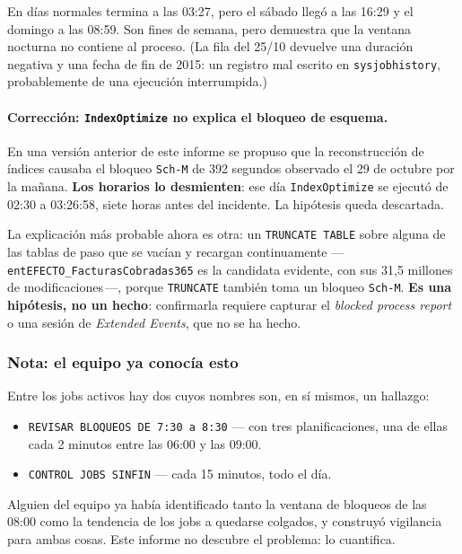 \documentclass[11pt,a4paper]{article}
\newcommand{\cod}[1]{\texttt{\small #1}}
\begin{document}
En días normales termina a las 03:27, pero el sábado llegó a las 16:29 y el
domingo a las 08:59. Son fines de semana, pero demuestra que la ventana
nocturna no contiene al proceso. (La fila del 25/10 devuelve una duración
negativa y una fecha de fin de 2015: un registro mal escrito en
\cod{sysjobhistory}, probablemente de una ejecución interrumpida.)

\paragraph{Corrección: \cod{IndexOptimize} no explica el bloqueo de esquema.}
En una versión anterior de este informe se propuso que la reconstrucción de
índices causaba el bloqueo \cod{Sch-M} de 392 segundos observado el 29 de
octubre por la mañana. \textbf{Los horarios lo desmienten}: ese día
\cod{IndexOptimize} se ejecutó de 02:30 a 03:26:58, siete horas antes del
incidente. La hipótesis queda descartada.

La explicación más probable ahora es otra: un \cod{TRUNCATE TABLE} sobre
alguna de las tablas de paso que se vacían y recargan continuamente
—\,\cod{entEFECTO\_FacturasCobradas365} es la candidata evidente, con sus
31,5 millones de modificaciones\,—, porque \cod{TRUNCATE} también toma un
bloqueo \cod{Sch-M}. \textbf{Es una hipótesis, no un hecho}: confirmarla
requiere capturar el \emph{blocked process report} o una sesión de
\emph{Extended Events}, que no se ha hecho.

\subsubsection*{Nota: el equipo ya conocía esto}

Entre los jobs activos hay dos cuyos nombres son, en sí mismos, un hallazgo:

\begin{itemize}\itemsep1pt
  \item \cod{REVISAR BLOQUEOS DE 7:30 a 8:30} — con tres planificaciones, una
        de ellas cada 2 minutos entre las 06:00 y las 09:00.
  \item \cod{CONTROL JOBS SINFIN} — cada 15 minutos, todo el día.
\end{itemize}

Alguien del equipo ya había identificado tanto la ventana de bloqueos de las
08:00 como la tendencia de los jobs a quedarse colgados, y construyó
vigilancia para ambas cosas. Este informe no descubre el problema: lo
cuantifica.
\end{document}
